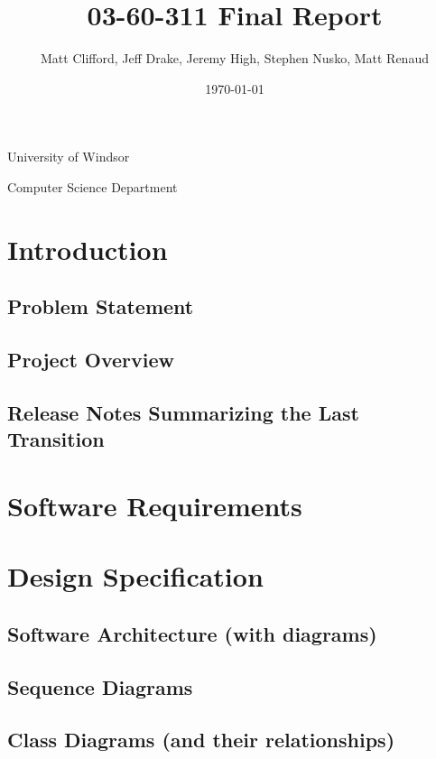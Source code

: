 \documentclass[11pt]{article}
\title{03-60-311 Final Report}
\author{Matt Clifford, Jeff Drake, Jeremy High, Stephen Nusko, Matt Renaud}
\date{\today}
\begin{document}
\maketitle

\vspace{1in}

\begin{center}
  University of Windsor

  Computer Science Department
\end{center}

\newpage
\setcounter{tocdepth}{3}
\tableofcontents
\vspace*{1cm}

\section{Introduction}

\subsection{Problem Statement}

\subsection{Project Overview}

\subsection{Release Notes Summarizing the Last Transition}

\section{Software Requirements}

\section{Design Specification}

\subsection{Software Architecture (with diagrams)}

\subsection{Sequence Diagrams}

\subsection{Class Diagrams (and their relationships)}
\end{document}

